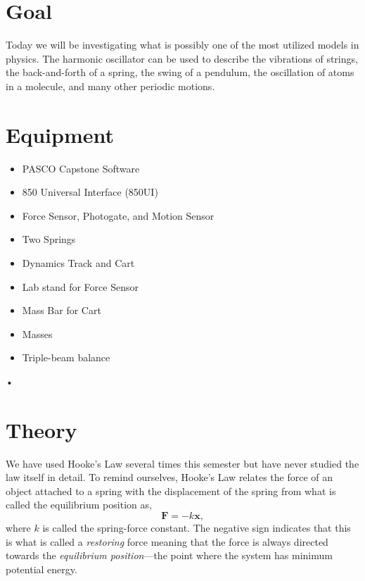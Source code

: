 \documentclass[main.tex]{subfiles}
\begin{document}
\section*{Goal}
Today we will be investigating what is possibly one of the most utilized models in physics. The harmonic oscillator can be used to describe the vibrations of strings, the back-and-forth of a spring, the swing of a pendulum, the oscillation of atoms in a molecule, and many other periodic motions.

\section*{Equipment}
\begin{itemize}
\item
PASCO Capstone Software
\item
850 Universal Interface (850UI)
\item
Force Sensor, Photogate, and Motion Sensor
\item
Two Springs
\item
Dynamics Track and Cart
\item
Lab stand for Force Sensor
\item
Mass Bar for Cart
\item
Masses
\item
Triple-beam balance
\end{itemize}•

\section*{Theory}
We have used Hooke's Law several times this semester but have never studied the law itself in detail. To remind ourselves, Hooke's Law relates the force of an object attached to a spring with the displacement of the spring from what is called the equilibrium position as,
\begin{equation} \label{eq:Hooke}
\mathbf{F}=-k\mathbf{x},
\end{equation}
where $k$ is called the spring-force constant. The negative sign indicates that this is what is called a \emph{restoring} force meaning that the force is always directed towards the \emph{equilibrium position}---the point where the system has minimum potential energy.
\end{document}
